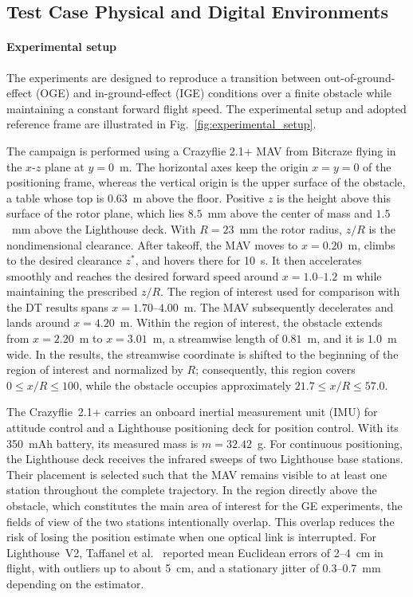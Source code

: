 \documentclass[journal]{IEEEtran}
\begin{document}
\subsection{Test Case Physical and Digital Environments}
\label{sec:setup}
\paragraph*{Experimental setup}
The experiments are designed to reproduce a transition between out-of-ground-effect (OGE) and in-ground-effect (IGE) conditions over a finite obstacle while maintaining a constant forward flight speed. The experimental setup and adopted reference frame are illustrated in Fig.~\ref{fig:experimental_setup}.

The campaign is performed using a Crazyflie 2.1+ MAV from Bitcraze flying in the $x$-$z$ plane at $y=0$~m. The horizontal axes keep the origin $x=y=0$ of the positioning frame, whereas the vertical origin is the upper surface of the obstacle, a table whose top is $0.63$~m above the floor. Positive $z$ is the height above this surface of the rotor plane, which lies $8.5$~mm above the center of mass and $1.5$~mm above the Lighthouse deck. With $R=23$~mm the rotor radius, $z/R$ is the nondimensional clearance. After takeoff, the MAV moves to $x=0.20$~m, climbs to the desired clearance $z^\ast$, and hovers there for 10~s. It then accelerates smoothly and reaches the desired forward speed around $x=1.0$--$1.2$~m while maintaining the prescribed $z/R$. The region of interest used for comparison with the DT results spans $x=1.70$--$4.00$~m. The MAV subsequently decelerates and lands around $x=4.20$~m. Within the region of interest, the obstacle extends from $x=2.20$~m to $x=3.01$~m, a streamwise length of $0.81$~m, and it is $1.0$~m wide. In the results, the streamwise coordinate is shifted to the beginning of the region of interest and normalized by $R$; consequently, this region covers $0\leq x/R\leq100$, while the obstacle occupies approximately $21.7\leq x/R\leq57.0$.

The Crazyflie~2.1+ carries an onboard inertial measurement unit (IMU) for attitude control and a Lighthouse positioning deck for position control. With its 350~mAh battery, its measured mass is $m=32.42$~g. For continuous positioning, the Lighthouse deck receives the infrared sweeps of two Lighthouse base stations. Their placement is selected such that the MAV remains visible to at least one station throughout the complete trajectory. In the region directly above the obstacle, which constitutes the main area of interest for the GE experiments, the fields of view of the two stations intentionally overlap. This overlap reduces the risk of losing the position estimate when one optical link is interrupted. For Lighthouse~V2, Taffanel et al.~\cite{Taffanel2021Lighthouse} reported mean Euclidean errors of 2--4~cm in flight, with outliers up to about 5~cm, and a stationary jitter of 0.3--0.7~mm depending on the estimator. 
\end{document}
